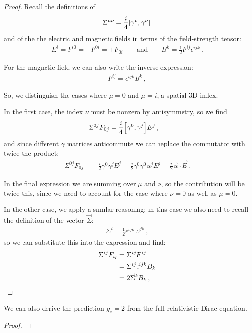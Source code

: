 \documentclass[main.tex]{subfiles}
\begin{document}
\begin{proof}
Recall the definitions of 
%
\begin{align}
\Sigma^{\mu \nu } = \frac{i}{4} \qty[\gamma^{\mu }, \gamma^{\nu }]
\,
\end{align}
%
and of the the electric and magnetic fields in terms of the field-strength tensor: 
%
\begin{align}
E^{i} = F^{i0} = - F^{0i} = +F_{0i}
\qquad \text{and} \qquad
B^{k} = \frac{1}{2} F^{ij} \epsilon^{ijk}
\,.
\end{align}

For the magnetic field we can also write the inverse expression: 
%
\begin{align}
F^{ij} = \epsilon^{ijk} B^{k}
\,,
\end{align}
%


So, we distinguish the cases where \(\mu = 0\) and \(\mu = i\), a spatial 3D index.

In the first case, the index \(\nu \) must be nonzero by antisymmetry, so we find
%
\begin{align}
\Sigma^{0j}F_{0j} &= \frac{i}{4} \qty[\gamma^{0}, \gamma^{j}] E^{j}
\,,
\end{align}
%
and since different \(\gamma \) matrices anticommute we can replace the commutator with twice the product: 
%
\begin{align}
\Sigma^{0j} F_{0j} &= \frac{i}{2} \gamma^{0} \gamma^{j} E^{j} = \frac{i}{2} \gamma^{0} \gamma^{0} \alpha^{j} E^{j} = \frac{i}{2} \vec{\alpha} \cdot \vec{E}
\,.
\end{align}

In the final expression we are summing over \(\mu \) and \(\nu \), so the contribution will be twice this, since we need to account for the case where \(\nu =0\) as well as \(\mu =0 \).

In the other case, we apply a similar reasoning; in this case we also need to recall the definition of the vector \(\vec{\Sigma}\): 
%
\begin{align}
\Sigma^{i} = \frac{1}{2} \epsilon^{ijk} \Sigma^{jk}
\,,
\end{align}
%
so we can substitute this into the expression and find:
%
\begin{align}
\Sigma^{ij} F_{ij} &= \Sigma^{ij} F^{ij}  \\
&= \Sigma^{ij} \tensor{\epsilon }{^{ijk}} B_{k}  \\
&= 2 \vec{\Sigma}^{k} B_{k}
\,,
\end{align}
%
\end{proof}


\begin{claim}
We can also derive the prediction \(g_e = 2\) from the full relativistic Dirac equation.
\end{claim}

\begin{proof}
\end{proof}
\end{document}
